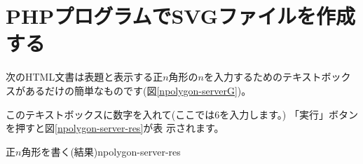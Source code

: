 \section{PHPプログラムでSVGファイルを作成する}
次のHTML文書は表題と表示する正$n$角形の$n$を入力するためのテキストボック
スがあるだけの簡単なものです(図\ref{npolygon-serverG})。


このテキストボックスに数字を入れて(ここでは$6$を入力します。)
「実行」ボタンを押すと図\ref{npolygon-server-res}が表
示されます。

{正$n$角形を書く(結果)}{npolygon-server-res}

